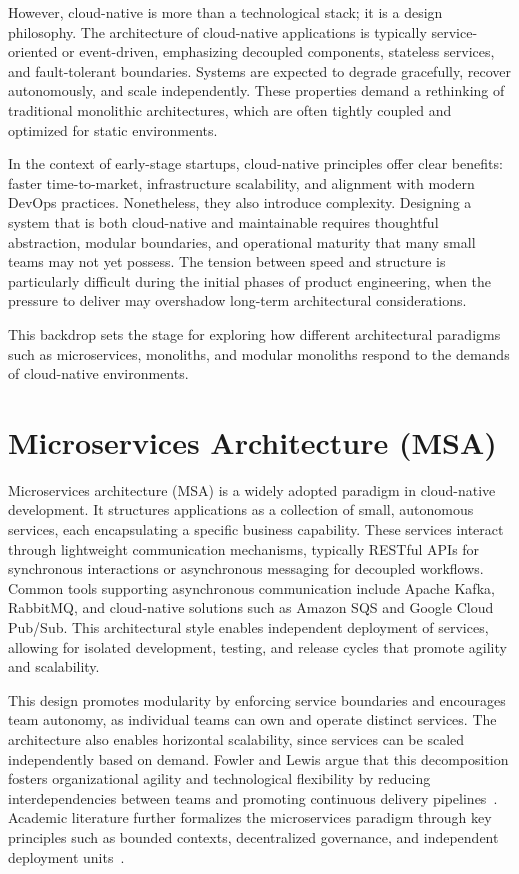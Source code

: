 However, cloud-native is more than a technological stack; it is a design philosophy. The architecture of cloud-native applications is typically service-oriented or event-driven, emphasizing decoupled components, stateless services, and fault-tolerant boundaries. Systems are expected to degrade gracefully, recover autonomously, and scale independently. These properties demand a rethinking of traditional monolithic architectures, which are often tightly coupled and optimized for static environments.

In the context of early-stage startups, cloud-native principles offer clear benefits: faster time-to-market, infrastructure scalability, and alignment with modern DevOps practices. Nonetheless, they also introduce complexity. Designing a system that is both cloud-native and maintainable requires thoughtful abstraction, modular boundaries, and operational maturity that many small teams may not yet possess. The tension between speed and structure is particularly difficult during the initial phases of product engineering, when the pressure to deliver may overshadow long-term architectural considerations.

This backdrop sets the stage for exploring how different architectural paradigms such as microservices, monoliths, and modular monoliths respond to the demands of cloud-native environments. 

\section{Microservices Architecture (MSA)}

Microservices architecture (MSA) is a widely adopted paradigm in cloud-native development. It structures applications as a collection of small, autonomous services, each encapsulating a specific business capability. These services interact through lightweight communication mechanisms, typically RESTful APIs for synchronous interactions or asynchronous messaging for decoupled workflows. Common tools supporting asynchronous communication include Apache Kafka, RabbitMQ, and cloud-native solutions such as Amazon SQS and Google Cloud Pub/Sub. This architectural style enables independent deployment of services, allowing for isolated development, testing, and release cycles that promote agility and scalability.


This design promotes modularity by enforcing service boundaries and encourages team autonomy, as individual teams can own and operate distinct services. The architecture also enables horizontal scalability, since services can be scaled independently based on demand. Fowler and Lewis argue that this decomposition fosters organizational agility and technological flexibility by reducing interdependencies between teams and promoting continuous delivery pipelines~\cite{fowler2014}. Academic literature further formalizes the microservices paradigm through key principles such as bounded contexts, decentralized governance, and independent deployment units~\cite{dragoni2017microservices, taibi2018definition, newman2015building}.


